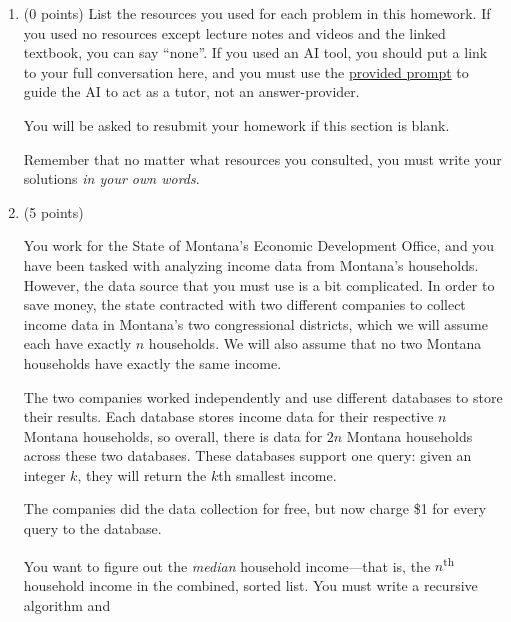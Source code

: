 \documentclass[11pt]{article}
\begin{document}


\begin{enumerate}


\item (0 points) List the resources you used for each problem in this homework. If you used no resources except
lecture notes and videos and the linked textbook, you can say ``none''. If you used
an AI tool, you should put a link to your full conversation here, and you must
use the
\href{https://umaal.org/files/teaching/csci332_fall2026/agents.md}{provided
prompt}
 to guide the AI to act
as a tutor, not an answer-provider.

You will be asked to resubmit your homework if this section is blank.

Remember that no matter what resources you consulted, you must write your solutions
\emph{in your own words}.

\item (5 points)

You work for the State of Montana's Economic Development Office, and you have been tasked with analyzing income data from Montana's households. However, the data source that you must use is a bit complicated.
In order to save money, the state contracted with two different companies to collect income data in Montana's two congressional districts, which we will assume each have exactly $n$ households. We will also assume that no two Montana households have exactly the same income.

The two companies worked independently and use different databases to store their results. Each database stores income data for their respective $n$ Montana households, so overall, there is data for $2n$ Montana households across these two databases. These databases support one query: given an integer $k$, they will return the $k$th smallest income.

The companies did the data collection for free, but now charge \$1 for every query to the database.

You want to figure out the \emph{median} household income---that is, the
$n$\textsuperscript{th} household income in the combined, sorted list.
You must write a recursive algorithm and




\end{enumerate}
\end{document}
